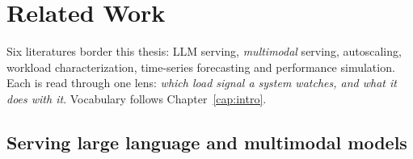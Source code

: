 %
\chapter{Related Work}
\label{cap:related}

Six literatures border this thesis: LLM serving, \emph{multimodal}
serving, autoscaling, workload characterization, time-series forecasting
and performance simulation. Each is read through one lens: \emph{which
load signal a system watches, and what it does with it}. Vocabulary
follows Chapter~\ref{cap:intro}.

\section{Serving large language and multimodal models}
\label{sec:rel-llm}

